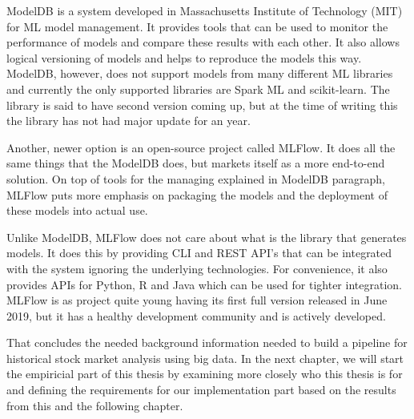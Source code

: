 ModelDB is a system developed in Massachusetts Institute of Technology (MIT) for ML model management.
It provides tools that can be used to monitor the performance of models and compare these results with each other.
It also allows logical versioning of models and helps to reproduce the models this way.
ModelDB, however, does not support models from many different ML libraries and currently the only supported libraries are Spark ML and scikit-learn.
The library is said to have second version coming up, but at the time of writing this the library has not had major update for an year.
\cite{modeldb}

Another, newer option is an open-source project called MLFlow.
It does all the same things that the ModelDB does, but markets itself as a more end-to-end solution.
On top of tools for the managing explained in ModelDB paragraph, MLFlow puts more emphasis on packaging the models and the deployment of these models into actual use.
\cite{mlflow}

Unlike ModelDB, MLFlow does not care about what is the library that generates models.
It does this by providing CLI and REST API's that can be integrated with the system ignoring the underlying technologies.
For convenience, it also provides APIs for Python, R and Java which can be used for tighter integration.
MLFlow is as project quite young having its first full version released in June 2019, but it has a healthy development community and is actively developed.
\cite{mlflow}

That concludes the needed background information needed to build a pipeline for historical stock market analysis using big data.
In the next chapter, we will start the empiricial part of this thesis by examining more closely who this thesis is for and defining the requirements for our implementation part based on the results from this and the following chapter.